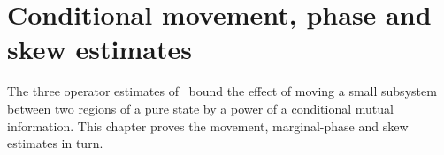\chapter{Conditional movement, phase and skew estimates}
\label{ch:conditional_estimates}

The three operator estimates of~\cite[Section~5]{OpenAI2026AreaLaw} bound the
effect of moving a small subsystem between two regions of a pure state by a
power of a conditional mutual information. This chapter proves the movement,
marginal-phase and skew estimates in turn.




